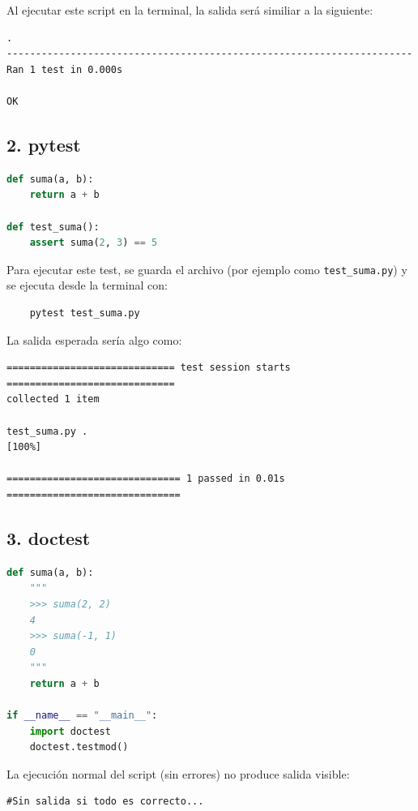 \documentclass[12pt]{article}
\begin{document}
Al ejecutar este script en la terminal, la salida será similiar a la siguiente:

\begin{lstlisting}
.
----------------------------------------------------------------------
Ran 1 test in 0.000s

OK
\end{lstlisting}

\subsection*{2. pytest}

\begin{lstlisting}[language=Python]
def suma(a, b):
    return a + b

def test_suma():
    assert suma(2, 3) == 5
\end{lstlisting}

Para ejecutar este test, se guarda el archivo (por ejemplo como \texttt{test\_suma.py}) y se ejecuta desde la terminal con:

\begin{lstlisting}
    pytest test_suma.py
\end{lstlisting}

La salida esperada sería algo como:

\begin{lstlisting}
============================= test session starts =============================
collected 1 item

test_suma.py .                                                        [100%]

============================== 1 passed in 0.01s ==============================
\end{lstlisting}

\subsection*{3. doctest}

\begin{lstlisting}[language=Python]
def suma(a, b):
    """
    >>> suma(2, 2)
    4
    >>> suma(-1, 1)
    0
    """
    return a + b

if __name__ == "__main__":
    import doctest
    doctest.testmod()
\end{lstlisting}
La ejecución normal del script (sin errores) no produce salida visible:

\begin{lstlisting}
#Sin salida si todo es correcto...
\end{lstlisting}
\end{document}
